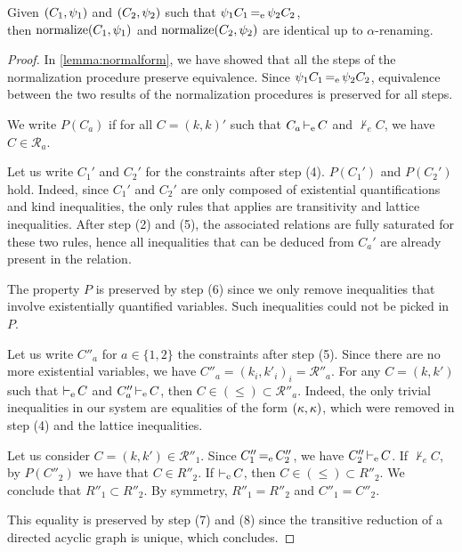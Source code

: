 \begin{lemma}[Uniqueness]
  Given $(C_1,\mathrm{\psi}_1)$ and $(C_2,\mathrm{\psi}_2)$ such that
  $\mathrm{\psi}_1 C_1 \operatorname{=_e} \mathrm{\psi}_2 C_2$,\\
  then
  $\operatorname{normalize}(C_1,\mathrm{\psi}_1)$ and $\operatorname{normalize}(C_2,\mathrm{\psi}_2)$
  are identical up to $\alpha$-renaming.
\end{lemma}
\begin{proof}
  In \cref{lemma:normalform}, we have showed that all the steps of the
  normalization procedure preserve equivalence.
  Since $\mathrm{\psi}_1 C_1 \operatorname{=_e} \mathrm{\psi}_2 C_2$, equivalence between
  the two results of the normalization procedures is preserved for all steps.

  We write $P(C_a)$ if for all $C = (k, k)'$
  such that $C_a \operatorname{\vdash_e} C$ and $\nvdash_eC$,
  we have $C \in {\mathcal R}_a$.

  Let us write $C_1'$ and $C_2'$ for the constraints after step (4). $P(C_1')$ and
  $P(C_2')$ hold. Indeed, since $C_1'$ and $C_2'$ are only composed
  of existential quantifications and kind inequalities, the only rules
  that applies are transitivity and lattice inequalities.
  After step (2) and (5), the associated relations are fully saturated for these
  two rules, hence all inequalities that can be deduced from $C_a'$ are already
  present in the relation.

  The property $P$ is preserved by step (6) since we only remove
  inequalities that involve existentially quantified variables. Such
  inequalities could not be picked in $P$.

  Let us write $C''_a$ for $a\in\{1,2\}$ the constraints after step (5).
  Since there are no more existential variables,
  we have $C''_a=(k_i,k'_i)_i=\mathcal R''_a$.
  For any $C=(k,k')$ such that $\operatorname{\vdash_e} C$ and $C''_a \operatorname{\vdash_e} C$,
  then $C \in (\leq) \subset {\mathcal R}''_a$.
  Indeed, the only trivial inequalities in our system are equalities of the form
  $(\kappa, \kappa)$, which were removed in step (4) and the lattice inequalities.

  Let us consider $C = (k,k') \in \mathcal R''_1$.
  Since $C''_1\operatorname{=_e} C''_2$, we have $C''_2 \operatorname{\vdash_e} C$.
  If $\nvdash_e{C}$, by $P(C''_2)$ we have that
  $C\in R''_2$.
  If $\operatorname{\vdash_e} C$, then $C\in (\leq) \subset R''_2$.
  We conclude that $R''_1 \subset R''_2$.
  By symmetry, $R''_1 = R''_2$ and $C''_1 = C''_2$.

  This equality is preserved by step (7) and (8)
  since the transitive reduction of a directed acyclic graph is unique,
  which concludes.
\end{proof}

